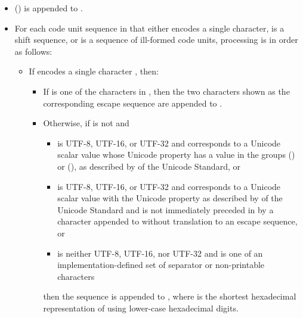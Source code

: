 \begin{itemize}
\item
{} () is appended to .

\item
For each code unit sequence  in  that either
encodes a single character,
is a shift sequence, or
is a sequence of ill-formed code units,
processing is in order as follows:

\begin{itemize}
\item
If  encodes a single character , then:

\begin{itemize}
\item
If  is one of the characters in ,
then the two characters shown as the corresponding escape sequence
are appended to .

\item
Otherwise, if  is not  and

\begin{itemize}
\item
{} is UTF-8, UTF-16, or UTF-32 and
 corresponds to a Unicode scalar value
whose Unicode property  has a value in the groups
 () or  (),
as described by  of the Unicode Standard, or

\item
{} is UTF-8, UTF-16, or UTF-32 and
 corresponds to a Unicode scalar value
with the Unicode property 
as described by  of the Unicode Standard and
 is not immediately preceded in  by
a character  appended to 
without translation to an escape sequence, or

\item
{} is neither UTF-8, UTF-16, nor UTF-32 and
 is one of an implementation-defined set
of separator or non-printable characters
\end{itemize}

then the sequence 
is appended to ,
where 
is the shortest hexadecimal representation
of  using lower-case hexadecimal digits.


\end{itemize}
\end{itemize}
\end{itemize}
